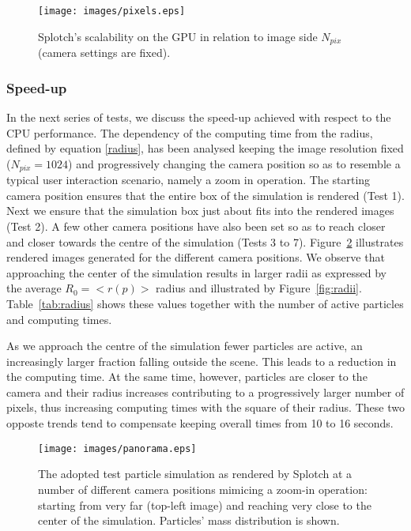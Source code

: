 \documentclass[1p]{elsarticle}
\begin{document}
\begin{figure}
\centering
\texttt{[image: images/pixels.eps]}
\caption{Splotch's scalability on the GPU in relation to image side $N_{pix}$ (camera settings are fixed).}
\label{fig:pixels}
\end{figure}


\subsubsection{Speed-up}
\label{sec:speed-up}
In the next series of tests, we discuss the speed-up achieved with respect to the CPU performance. 
The dependency of the computing time from the radius, defined by equation \eqref{radius}, has been analysed keeping 
the image resolution fixed ($N_{pix} = 1024$) and progressively changing the camera position 
so as to resemble a typical user interaction scenario, namely a zoom in operation. 
The starting camera position ensures that the entire box of the simulation is rendered (Test 1). 
Next we ensure that the simulation box just about fits into the rendered images (Test 2). 
A few other camera positions have also been set so as to reach closer and closer towards the 
centre of the simulation (Tests 3 to 7). Figure~\ref{fig:panorama} illustrates rendered images 
generated for the different camera positions.
We observe that approaching the center of the simulation results in larger radii 
as expressed by the average $R_0=<r(p)>$ radius and illustrated by Figure~\ref{fig:radii}. 
Table~\ref{tab:radius} shows these values together with the number of active particles and computing times. 

As we approach the centre of the simulation fewer particles are active, an increasingly larger 
fraction falling outside the scene. This leads to a reduction in the computing time. At the same
time, however, particles are closer to the camera and their radius increases contributing to 
a progressively larger number of pixels,
thus increasing computing times with the square of their radius. 
These two opposte trends tend to compensate keeping overall times from 10 to 16 seconds.

\begin{figure}
\centering
\texttt{[image: images/panorama.eps]}
\caption{The adopted test particle simulation as rendered by Splotch at a number of different camera positions mimicing a zoom-in operation: starting from very far (top-left image) and reaching very close to the center of the simulation. Particles' mass distribution is shown.}
\label{fig:panorama}
\end{figure}
\end{document}
